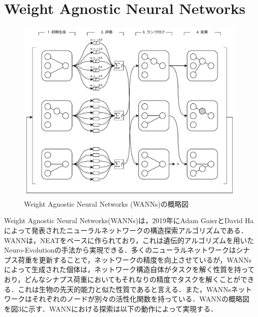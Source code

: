 \section{Weight Agnostic Neural Networks}

\begin{figure}[h]
    \begin{center}
        \includegraphics[scale=0.8]{img/expwann.pdf}
        \caption{Weight Agnostic Neural Networks (WANNs)の概略図}
    \end{center}
\end{figure}

Weight Agnostic Neural Networks(WANNs)は，2019年にAdam GaierとDavid Haによって発表されたニューラルネットワークの構造探索アルゴリズムである\cite{WANN}．WANNは，NEAT\cite{NEAT}をベースに作られており，これは遺伝的アルゴリズム\cite{遺伝的アルゴリズム}を用いたNeuro-Evolution\cite{NE}の手法から実現できる．多くのニューラルネットワークはシナプス荷重を更新することで，ネットワークの精度を向上させているが，WANNsによって生成された個体は，ネットワーク構造自体がタスクを解く性質を持っており，どんなシナプス荷重においてもそれなりの精度でタスクを解くことができる．これは生物の先天的能力と似た性質であると言える\cite{先天的能力}．また，WANNsネットワークはそれぞれのノードが別々の活性化関数を持っている．WANNの概略図を図3に示す．WANNにおける探索は以下の動作によって実現する．

